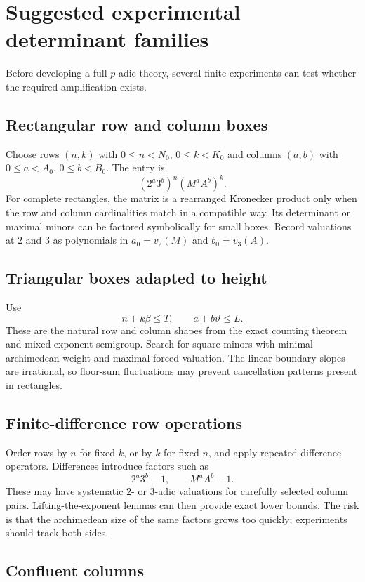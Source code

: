 \documentclass[11pt,oneside]{article}
\theoremstyle{definition}
\theoremstyle{remark}
\newcommand{\thetaq}{\vartheta}
\newcommand{\vpp}[2]{v_{#1}\!\left(#2\right)}
\begin{document}
\section{Suggested experimental determinant families}
\label{app:experiments}

Before developing a full $p$-adic theory, several finite experiments can test whether the
required amplification exists.

\subsection{Rectangular row and column boxes}

Choose rows $(n,k)$ with $0\le n<N_0$, $0\le k<K_0$ and columns $(a,b)$ with
$0\le a<A_0$, $0\le b<B_0$.  The entry is
\[
 (2^a3^b)^n(M^aA^b)^k.
\]
For complete rectangles, the matrix is a rearranged Kronecker product only when the row and
column cardinalities match in a compatible way.  Its determinant or maximal minors can be
factored symbolically for small boxes.  Record valuations at $2$ and $3$ as polynomials in
$a_0=\vpp{2}{M}$ and $b_0=\vpp{3}{A}$.

\subsection{Triangular boxes adapted to height}

Use
\[
 n+k\beta\le T,
 \qquad
 a+b\thetaq\le L.
\]
These are the natural row and column shapes from the exact counting theorem and mixed-exponent
semigroup.  Search for square minors with minimal archimedean weight and maximal forced
valuation.  The linear boundary slopes are irrational, so floor-sum fluctuations may prevent
cancellation patterns present in rectangles.

\subsection{Finite-difference row operations}

Order rows by $n$ for fixed $k$, or by $k$ for fixed $n$, and apply repeated difference
operators.  Differences introduce factors such as
\[
 2^a3^b-1,
 \qquad
 M^aA^b-1.
\]
These may have systematic $2$- or $3$-adic valuations for carefully selected column pairs.
Lifting-the-exponent lemmas can then provide exact lower bounds.  The risk is that the
archimedean size of the same factors grows too quickly; experiments should track both sides.

\subsection{Confluent columns}
\end{document}
